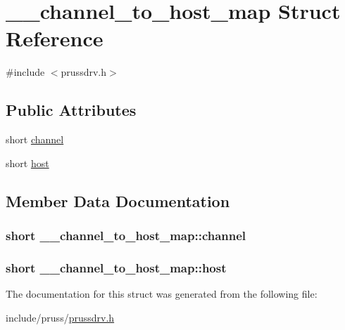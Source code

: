 \hypertarget{struct____channel__to__host__map}{\section{\-\_\-\-\_\-channel\-\_\-to\-\_\-host\-\_\-map Struct Reference}
\label{struct____channel__to__host__map}
}


{\ttfamily \#include $<$prussdrv.\-h$>$}

\subsection*{Public Attributes}
\begin{DoxyCompactItemize}
\item 
short \hyperlink{struct____channel__to__host__map_aba81cea787f132fd67e37d429e869c9f}{channel}
\item 
short \hyperlink{struct____channel__to__host__map_a6e47ff59629590078c2c6c6ae715bbcf}{host}
\end{DoxyCompactItemize}


\subsection{Member Data Documentation}
\hypertarget{struct____channel__to__host__map_aba81cea787f132fd67e37d429e869c9f}{
\subsubsection[{channel}]{\setlength{\rightskip}{0pt plus 5cm}short \-\_\-\-\_\-channel\-\_\-to\-\_\-host\-\_\-map\-::channel}}\label{struct____channel__to__host__map_aba81cea787f132fd67e37d429e869c9f}
\hypertarget{struct____channel__to__host__map_a6e47ff59629590078c2c6c6ae715bbcf}{
\subsubsection[{host}]{\setlength{\rightskip}{0pt plus 5cm}short \-\_\-\-\_\-channel\-\_\-to\-\_\-host\-\_\-map\-::host}}\label{struct____channel__to__host__map_a6e47ff59629590078c2c6c6ae715bbcf}


The documentation for this struct was generated from the following file\-:\begin{DoxyCompactItemize}
\item 
include/pruss/\hyperlink{prussdrv_8h}{prussdrv.\-h}\end{DoxyCompactItemize}
